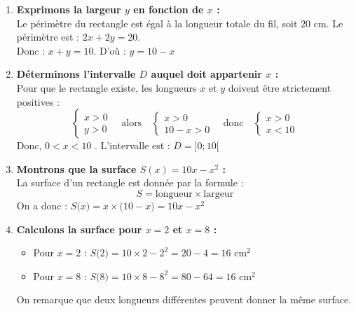 \documentclass[10pt, a4paper]{article}
\begin{document}
\begin{Solution}[ACTIVITÉ][1]
\begin{enumerate}[leftmargin=*,itemsep=0.5pt]
    \item \textbf{Exprimons la largeur $y$ en fonction de $x$ :} \\
    Le périmètre du rectangle est égal à la longueur totale du fil, soit $20\text{ cm}$.
    Le périmètre est : $2x + 2y = 20$. \\
    Donc : $x + y = 10$. D'où :   $y = 10 - x$

    \item \textbf{Déterminons l'intervalle $D$ auquel doit appartenir $x$ :} \\
    Pour que le rectangle existe, les longueurs $x$  et $y$ doivent être strictement positives :
    \[
\begin{cases}
    x > 0 \\
    y > 0
\end{cases} \quad \text{alors} \quad
\begin{cases}
    x > 0 \\
    10 - x > 0
\end{cases} \quad \text{donc} \quad
\begin{cases}
    x > 0 \\
    x < 10
\end{cases}
\]
    Donc,  $0<x<10$ . L'intervalle est : $D = \big] 0 ; 10 \big[$

    \item \textbf{Montrons que la surface $S(x) = 10x - x^2$ :} \\
    La surface d'un rectangle est donnée par la formule :
    $$S = \text{longueur} \times \text{largeur}$$
    On a donc :
    $ S\big( x \big) = x \times \big( 10 - x \big) = 10x - x^2$

    \item \textbf{Calculons la surface pour $x = 2$ et $x = 8$ :}
    \begin{itemize}[leftmargin=*,itemsep=0.5pt]
        \item Pour $x = 2$ :
         $S\big( 2 \big) = 10 \times 2 - 2^2 = 20 - 4 = 16\text{ cm}^2 $
        \item Pour $x = 8$ :
        $S\big( 8 \big) = 10 \times 8 - 8^2 = 80 - 64 = 16\text{ cm}^2$
    \end{itemize}
    On remarque que deux longueurs différentes peuvent donner la même surface.


\end{enumerate}
\end{Solution}
\end{document}
